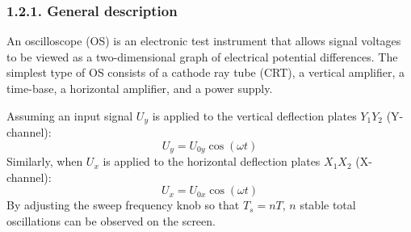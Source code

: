 \documentclass[12pt,oneside,a4paper]{article}
\theoremstyle{definition}
\begin{document}
	\subsubsection*{1.2.1. General description}
	An oscilloscope (OS) is an electronic test instrument that allows signal voltages to be viewed as a two-dimensional graph of electrical potential differences. The simplest type of OS consists of a cathode ray tube (CRT), a vertical amplifier, a time-base, a horizontal amplifier, and a power supply.
	
	\vspace{0.5cm}
	\hspace{-0.73cm}
	Assuming an input signal $U_y$ is applied to the vertical deflection plates $Y_1 Y_2$ (Y-channel):
	\begin{equation}
		U_y = U_{0y} \cos(\omega t)
	\end{equation}
	Similarly, when $U_x$ is applied to the horizontal deflection plates $X_1 X_2$ (X-channel):
	\begin{equation}
		U_x = U_{0x} \cos(\omega t)
	\end{equation}
	By adjusting the sweep frequency knob so that $T_s = nT$, $n$ stable total oscillations can be observed on the screen.
	
\end{document}

